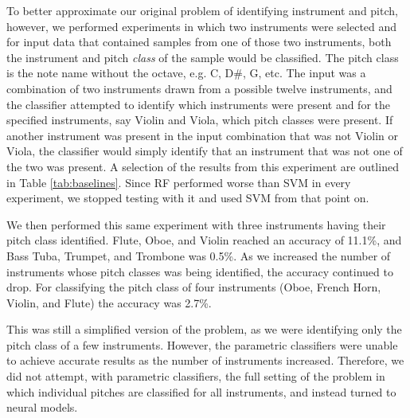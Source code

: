 \documentclass[runningheads,a4paper]{llncs}
\begin{document}
To better approximate our original problem of identifying instrument and pitch, however, we performed experiments in which two instruments were selected and for input data that contained samples from one of those two instruments, both the instrument and pitch \emph{class} of the sample would be classified. The pitch class is the note name without the octave, e.g. C, D\#, G, etc. The input was a combination of two instruments drawn from a possible twelve instruments, and the classifier attempted to identify which instruments were present and for the specified instruments, say Violin and Viola, which pitch classes were present. If another instrument was present in the input combination that was not Violin or Viola, the classifier would simply identify that an instrument that was not one of the two was present. A selection of the results from this experiment are outlined in Table \ref{tab:baselines}. Since RF performed worse than SVM in every experiment, we stopped testing with it and used SVM from that point on.

We then performed this same experiment with three instruments having their pitch class identified. Flute, Oboe, and Violin reached an accuracy of 11.1\%, and Bass Tuba, Trumpet, and Trombone was 0.5\%. As we increased the number of instruments whose pitch classes was being identified, the accuracy continued to drop. For classifying the pitch class of four instruments (Oboe, French Horn, Violin, and Flute) the accuracy was 2.7\%.

This was still a simplified version of the problem, as we were identifying only the pitch class of a few instruments. However, the parametric classifiers were unable to achieve accurate results as the number of instruments increased. Therefore, we did not attempt, with parametric classifiers, the full setting of the problem in which individual pitches are classified for all instruments, and instead turned to neural models.

\end{document}
